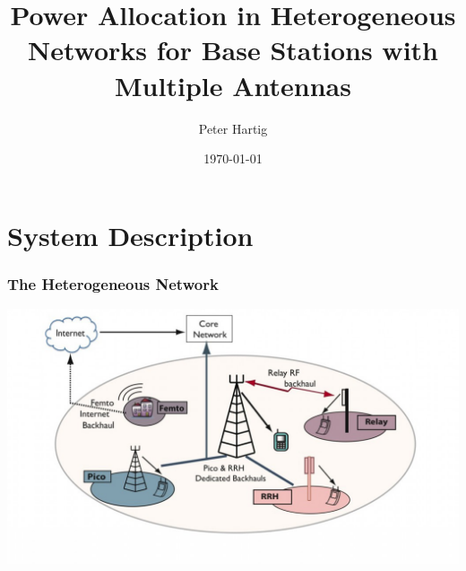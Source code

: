 \documentclass[10pt,tgadventor, onlymath]{beamer}
\title{\large \bfseries Power Allocation in Heterogeneous Networks for Base Stations with Multiple Antennas}
\author{Peter Hartig\\[3ex]
}
\date{\today}
\begin{document}
\frame{
\thispagestyle{empty}
\titlepage
}

\section{System Description}
\begin{frame}
\frametitle{The Heterogeneous Network}
	\includegraphics[width=\textwidth]{het_net}
\end{frame}
\end{document}
